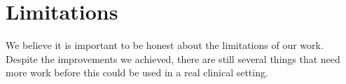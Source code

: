 \documentclass[10pt, twocolumn]{article}
\begin{document}
\begin{table}[H]
\centering
\caption{Summary of Our Results Across All Datasets.}
\label{tab:our_results}
\end{table}

\section{Limitations}

We believe it is important to be honest about the limitations of our work. Despite the
improvements we achieved, there are still several things that need more work before this
could be used in a real clinical setting.
\end{document}
